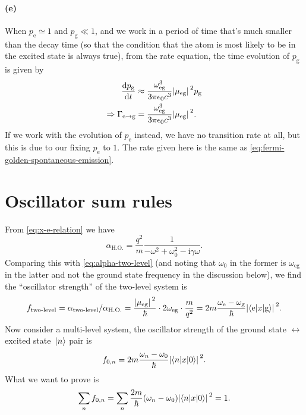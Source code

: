 \documentclass[hyperref, a4paper]{article}
\newcommand*{\ii}{\mathrm{i}}
\newcommand*{\omegae}{\omega_{\text{e}}}
\newcommand*{\omegag}{\omega_{\text{g}}}
\newcommand*{\omegaeg}{\omega_{\text{eg}}}
\newcommand*{\mueg}{\mu_{\text{eg}}}
\newcommand*{\pope}{p_{\text{e}}}
\newcommand*{\popg}{p_{\text{g}}}
\begin{document}
\paragraph{(e)} When $\pope \simeq 1$ and $\popg \ll 1$, 
and we work in a period of time that's much smaller than the decay time
(so that the condition that the atom is most likely 
to be in the excited state is always true),
from the rate equation, the time evolution of $\popg$ is given by 
\begin{equation}
    \begin{aligned}
        \dv{\popg}{t} &\approx \frac{\omegaeg^3}{3 \pi \epsilon_0 c^3} \abs*{\mueg}^2 \popg  \\
        \Rightarrow \Gamma_{\text{e} \to \text{g}}
        &= \frac{\omegaeg^3}{3 \pi \epsilon_0 c^3} \abs*{\mueg}^2.
    \end{aligned}
\end{equation}
If we work with the evolution of $\pope$ instead, 
we have no transition rate at all, but this is due to 
our fixing $\pope$ to $1$.
The rate given here is the same as \eqref{eq:fermi-golden-spontaneous-emission}.

\section{Oscillator sum rules}

From \eqref{eq:x-e-relation} we have 
\begin{equation}
    \alpha_{\text{H.O.}} = \frac{q^2}{m} \frac{1}{- \omega^2 + \omega_0^2 - \ii \gamma \omega}.
\end{equation}
Comparing this with \eqref{eq:alpha-two-level}
(and noting that $\omega_0$ in the former 
is $\omegaeg$ in the latter 
and not the ground state frequency in the discussion below), 
we find the ``oscillator strength'' of the two-level system is 
\begin{equation}
    f_{\text{two-level}} =  \alpha_{\text{two-level}} / \alpha_{\text{H.O.}}
    = \frac{\abs*{\mueg}^2}{\hbar} \cdot 2 \omegaeg \cdot \frac{m}{q^2}
    = 2m \frac{\omegae - \omegag}{\hbar} \abs*{\mel**{\text{e}}{x}{\text{g}}}^2.
\end{equation}
Now consider a multi-level system,
the oscillator strength of the ground state $\leftrightarrow$ excited state $\ket*{n}$ pair 
is 
\begin{equation}
    f_{0, n} = 2m \frac{\omega_n - \omega_0}{\hbar} \abs*{\mel**{n}{x}{0}}^2.
\end{equation}
What we want to prove is 
\begin{equation}
    \sum_n f_{0, n} = \sum_n \frac{2m}{\hbar} (\omega_n - \omega_0) \abs*{\mel**{n}{x}{0}}^2 = 1.
\end{equation}
\end{document}
